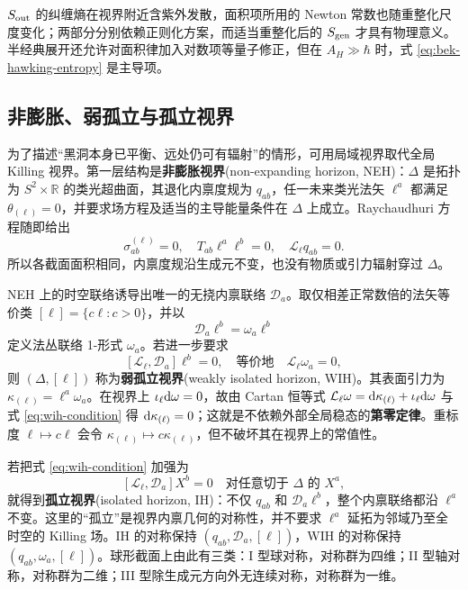 $S_{\rm out}$ 的纠缠熵在视界附近含紫外发散，面积项所用的 Newton 常数也随重整化尺度变化；两部分分别依赖正则化方案，而适当重整化后的 $S_{\rm gen}$ 才具有物理意义。半经典展开还允许对面积律加入对数项等量子修正，但在 $A_H\gg\hbar$ 时，式 \eqref{eq:bek-hawking-entropy} 是主导项。

\subsection{非膨胀、弱孤立与孤立视界}

为了描述“黑洞本身已平衡、远处仍可有辐射”的情形，可用局域视界取代全局 Killing 视界。第一层结构是\textbf{非膨胀视界}(non-expanding horizon, NEH)：$\Delta$ 是拓扑为 $S^2\times\mathbb R$ 的类光超曲面，其退化内禀度规为 $q_{ab}$，任一未来类光法矢 $\ell^a$ 都满足 $\theta_{(\ell)}=0$，并要求场方程及适当的主导能量条件在 $\Delta$ 上成立。Raychaudhuri 方程随即给出
\[
    \sigma^{(\ell)}_{ab}=0,\quad
    T_{ab}\ell^a\ell^b=0,\quad
    \mathcal L_\ell q_{ab}=0.
\]
所以各截面面积相同，内禀度规沿生成元不变，也没有物质或引力辐射穿过 $\Delta$。

NEH 上的时空联络诱导出唯一的无挠内禀联络 $\mathcal D_a$。取仅相差正常数倍的法矢等价类 $[\ell]=\{c\ell:c>0\}$，并以
\[
    \mathcal D_a\ell^b=\omega_a\ell^b
\]
定义法丛联络 1-形式 $\omega_a$。若进一步要求
\begin{equation}\label{eq:wih-condition}
    [\mathcal L_\ell,\mathcal D_a]\ell^b=0,
    \quad\text{等价地}\quad
    \mathcal L_\ell\omega_a=0,
\end{equation}
则 $(\Delta,[\ell])$ 称为\textbf{弱孤立视界}(weakly isolated horizon, WIH)。其表面引力为 $\kappa_{(\ell)}=\ell^a\omega_a$。在视界上 $\iota_\ell\dd\omega=0$，故由 Cartan 恒等式 $\mathcal L_\ell\omega=\dd\kappa_{(\ell)}+\iota_\ell\dd\omega$ 与式 \eqref{eq:wih-condition} 得 $\dd\kappa_{(\ell)}=0$；这就是不依赖外部全局稳态的\textbf{第零定律}。重标度 $\ell\mapsto c\ell$ 会令 $\kappa_{(\ell)}\mapsto c\kappa_{(\ell)}$，但不破坏其在视界上的常值性。

若把式 \eqref{eq:wih-condition} 加强为
\[
    [\mathcal L_\ell,\mathcal D_a]X^b=0
    \quad\text{对任意切于 }\Delta\text{ 的 }X^a,
\]
就得到\textbf{孤立视界}(isolated horizon, IH)：不仅 $q_{ab}$ 和 $\mathcal D_a\ell^b$，整个内禀联络都沿 $\ell^a$ 不变。这里的“孤立”是视界内禀几何的对称性，并不要求 $\ell^a$ 延拓为邻域乃至全时空的 Killing 场。IH 的对称保持 $(q_{ab},\mathcal D_a,[\ell])$，WIH 的对称保持 $(q_{ab},\omega_a,[\ell])$。球形截面上由此有三类：I 型球对称，对称群为四维；II 型轴对称，对称群为二维；III 型除生成元方向外无连续对称，对称群为一维。

